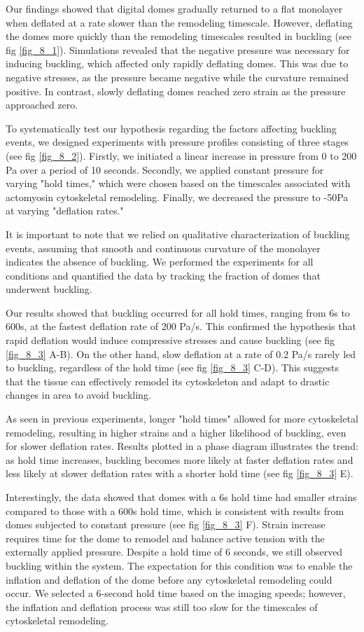 Our findings showed that digital domes gradually returned to a flat monolayer when deflated at a rate slower than the remodeling timescale. However, deflating the domes more quickly than the remodeling timescales resulted in buckling  (see fig \ref{fig_8_1}). Simulations revealed that the negative pressure was necessary for inducing buckling, which affected only rapidly deflating domes. This was due to negative stresses, as the pressure became negative while the curvature remained positive. In contrast, slowly deflating domes reached zero strain as the pressure approached zero.

To systematically test our hypothesis regarding the factors affecting buckling events, we designed experiments with pressure profiles consisting of three stages (see fig \ref{fig_8_2}). Firstly, we initiated a linear increase in pressure from 0 to 200 Pa over a period of 10 seconds. Secondly, we applied constant pressure for varying "hold times," which were chosen based on the timescales associated with actomyosin cytoskeletal remodeling. Finally, we decreased the pressure to -50Pa at varying "deflation rates."

It is important to note that we relied on qualitative characterization of buckling events, assuming that smooth and continuous curvature of the monolayer indicates the absence of buckling. We performed the experiments for all conditions and quantified the data by tracking the fraction of domes that underwent buckling.

Our results showed that buckling occurred for all hold times, ranging from 6s to 600s, at the fastest deflation rate of 200 Pa/s. This confirmed the hypothesis that rapid deflation would induce compressive stresses and cause buckling (see fig \ref{fig_8_3} A-B). On the other hand, slow deflation at a rate of 0.2 Pa/s rarely led to buckling, regardless of the hold time (see fig \ref{fig_8_3} C-D). This suggests that the tissue can effectively remodel its cytoskeleton and adapt to drastic changes in area to avoid buckling.

As seen in previous experiments, longer "hold times" allowed for more cytoskeletal remodeling, resulting in higher strains and a higher likelihood of buckling, even for slower deflation rates. Results plotted in a phase diagram illustrates the trend: as hold time increases, buckling becomes more likely at faster deflation rates and less likely at slower deflation rates with a shorter hold time (see fig \ref{fig_8_3} E).

Interestingly, the data showed that domes with a 6s hold time had smaller strains compared to those with a 600s hold time, which is consistent with results from domes subjected to constant pressure (see fig \ref{fig_8_3} F). Strain increase requires time for the dome to remodel and balance active tension with the externally applied pressure. Despite a hold time of 6 seconds, we still observed buckling within the system. The expectation for this condition was to enable the inflation and deflation of the dome before any cytoskeletal remodeling could occur. We selected a 6-second hold time based on the imaging speeds; however, the inflation and deflation process was still too slow for the timescales of cytoskeletal remodeling.

